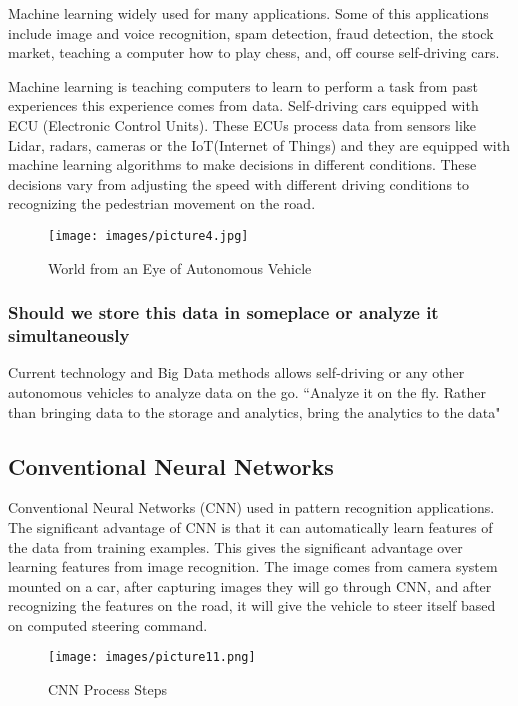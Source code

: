 \documentclass[sigconf]{acmart}
\begin{document}
Machine learning widely used for many applications. Some of this applications include image and voice recognition, spam detection, fraud detection, the stock market, teaching a computer how to play chess, and, off course self-driving cars. 
\par Machine learning is teaching computers to learn to perform a task from past experiences this experience comes from data. Self-driving cars equipped with ECU (Electronic Control Units). These ECUs process data from sensors like Lidar, radars, cameras or the IoT(Internet of Things) and they are equipped with machine learning algorithms to make decisions in different conditions.\cite{www-kdnuggets} These decisions vary from adjusting the speed with different driving conditions to recognizing the pedestrian movement on the road. 

\begin{figure}[h]
  \centering
      \texttt{[image: images/picture4.jpg]}
  \caption{World from an Eye of Autonomous Vehicle}\label{F:Lidar}
\end{figure}

\subsubsection{Should we store this data in someplace or analyze it simultaneously}
Current technology and Big Data methods allows self-driving or any other autonomous vehicles to analyze data on the go.\cite{www-sas} 
    ``Analyze it on the fly. Rather than bringing data to the storage and analytics, bring the analytics to the data"\cite{www-sas}

\subsection{Conventional Neural Networks}

Conventional Neural Networks (CNN)\cite{nvidia} used in pattern recognition applications. The significant advantage of CNN is that it can automatically learn features of the data from training examples. \cite{nvidia} This gives the significant advantage over learning features from image recognition. The image comes from camera system mounted on a car, after capturing images they will go through CNN, and after recognizing the features on the road, it will give the vehicle to steer itself based on computed steering command.\cite{nvidia} 

\begin{figure}[!ht]
  \centering
      \texttt{[image: images/picture11.png]}
  \caption{CNN Process Steps}\label{F:nvidiaCNNmodel}
\end{figure}
\end{document}
